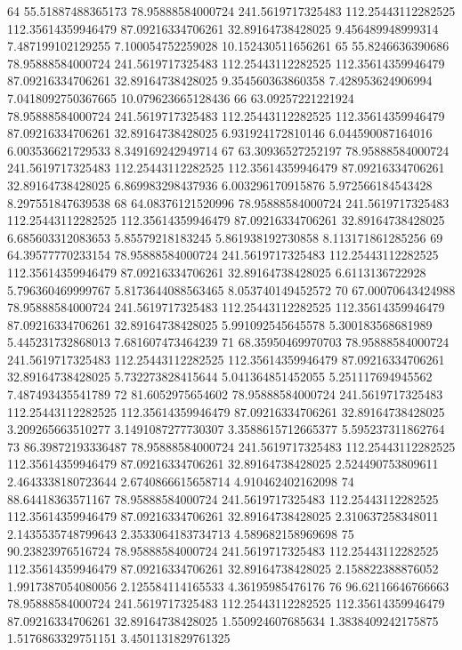{64 55.51887488365173 78.95888584000724 241.5619717325483 112.25443112282525 112.35614359946479 87.09216334706261 32.89164738428025 9.456489948999314 7.487199102129255 7.100054752259028 10.152430511656261
65 55.8246636390686 78.95888584000724 241.5619717325483 112.25443112282525 112.35614359946479 87.09216334706261 32.89164738428025 9.354560363860358 7.428953624906994 7.0418092750367665 10.079623665128436
66 63.09257221221924 78.95888584000724 241.5619717325483 112.25443112282525 112.35614359946479 87.09216334706261 32.89164738428025 6.931924172810146 6.044590087164016 6.003536621729533 8.349169242949714
67 63.30936527252197 78.95888584000724 241.5619717325483 112.25443112282525 112.35614359946479 87.09216334706261 32.89164738428025 6.869983298437936 6.003296170915876 5.972566184543428 8.297551847639538
68 64.08376121520996 78.95888584000724 241.5619717325483 112.25443112282525 112.35614359946479 87.09216334706261 32.89164738428025 6.685603312083653 5.85579218183245 5.861938192730858 8.113171861285256
69 64.39577770233154 78.95888584000724 241.5619717325483 112.25443112282525 112.35614359946479 87.09216334706261 32.89164738428025 6.6113136722928 5.796360469999767 5.8173644088563465 8.053740149452572
70 67.00070643424988 78.95888584000724 241.5619717325483 112.25443112282525 112.35614359946479 87.09216334706261 32.89164738428025 5.991092545645578 5.300183568681989 5.445231732868013 7.681607473464239
71 68.35950469970703 78.95888584000724 241.5619717325483 112.25443112282525 112.35614359946479 87.09216334706261 32.89164738428025 5.732273828415644 5.041364851452055 5.251117694945562 7.487493435541789
72 81.6052975654602 78.95888584000724 241.5619717325483 112.25443112282525 112.35614359946479 87.09216334706261 32.89164738428025 3.209265663510277 3.1491087277730307 3.3588615712665377 5.595237311862764
73 86.39872193336487 78.95888584000724 241.5619717325483 112.25443112282525 112.35614359946479 87.09216334706261 32.89164738428025 2.524490753809611 2.4643338180723644 2.6740866615658714 4.910462402162098
74 88.64418363571167 78.95888584000724 241.5619717325483 112.25443112282525 112.35614359946479 87.09216334706261 32.89164738428025 2.310637258348011 2.1435535748799643 2.3533064183734713 4.589682158969698
75 90.23823976516724 78.95888584000724 241.5619717325483 112.25443112282525 112.35614359946479 87.09216334706261 32.89164738428025 2.158822388876052 1.9917387054080056 2.125584114165533 4.36195985476176
76 96.62116646766663 78.95888584000724 241.5619717325483 112.25443112282525 112.35614359946479 87.09216334706261 32.89164738428025 1.550924607685634 1.3838409242175875 1.5176863329751151 3.4501131829761325
}
